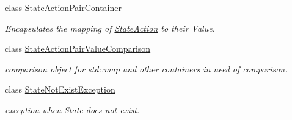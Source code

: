 \begin{DoxyCompactItemize}
class \hyperlink{classAI_1_1StateActionPairContainer}{State\+Action\+Pair\+Container}
\begin{DoxyCompactList}\small\item\em Encapsulates the mapping of \hyperlink{classAI_1_1StateAction}{State\+Action} to their Value. \end{DoxyCompactList}\item 
class \hyperlink{classAI_1_1StateActionPairValueComparison}{State\+Action\+Pair\+Value\+Comparison}
\begin{DoxyCompactList}\small\item\em comparison object for std\+::map and other containers in need of comparison. \end{DoxyCompactList}\item 
class \hyperlink{classAI_1_1StateNotExistException}{State\+Not\+Exist\+Exception}
\begin{DoxyCompactList}\small\item\em exception when State does not exist. \end{DoxyCompactList}\end{DoxyCompactItemize}
